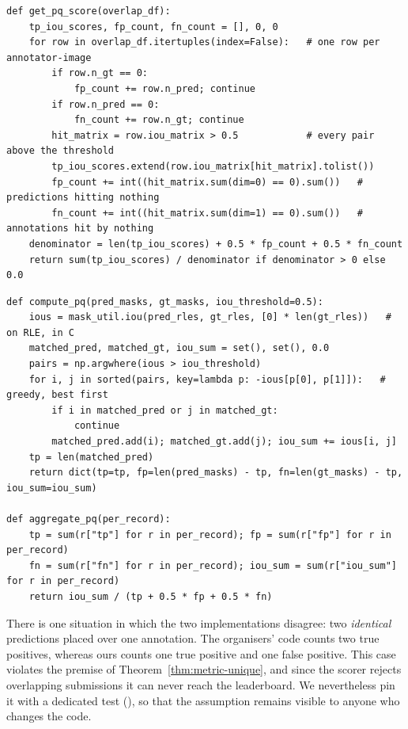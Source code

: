 \begin{lstlisting}[caption={The organisers' PQ, from their self-evaluation notebook (\file{experiments/exp\_145\_host\_evaluation/host/self\_evaluation\_notebook.ipynb}), lightly condensed.},label=lst:metric-host]
def get_pq_score(overlap_df):
    tp_iou_scores, fp_count, fn_count = [], 0, 0
    for row in overlap_df.itertuples(index=False):   # one row per annotator-image
        if row.n_gt == 0:
            fp_count += row.n_pred; continue
        if row.n_pred == 0:
            fn_count += row.n_gt; continue
        hit_matrix = row.iou_matrix > 0.5            # every pair above the threshold
        tp_iou_scores.extend(row.iou_matrix[hit_matrix].tolist())
        fp_count += int((hit_matrix.sum(dim=0) == 0).sum())   # predictions hitting nothing
        fn_count += int((hit_matrix.sum(dim=1) == 0).sum())   # annotations hit by nothing
    denominator = len(tp_iou_scores) + 0.5 * fp_count + 0.5 * fn_count
    return sum(tp_iou_scores) / denominator if denominator > 0 else 0.0
\end{lstlisting}

\begin{lstlisting}[caption={Our PQ for one record, and the pooling over records. Condensed from \file{shared/utils.py:compute\_pq} and \file{aggregate\_pq}.},label=lst:metric-ours]
def compute_pq(pred_masks, gt_masks, iou_threshold=0.5):
    ious = mask_util.iou(pred_rles, gt_rles, [0] * len(gt_rles))   # on RLE, in C
    matched_pred, matched_gt, iou_sum = set(), set(), 0.0
    pairs = np.argwhere(ious > iou_threshold)
    for i, j in sorted(pairs, key=lambda p: -ious[p[0], p[1]]):   # greedy, best first
        if i in matched_pred or j in matched_gt:
            continue
        matched_pred.add(i); matched_gt.add(j); iou_sum += ious[i, j]
    tp = len(matched_pred)
    return dict(tp=tp, fp=len(pred_masks) - tp, fn=len(gt_masks) - tp, iou_sum=iou_sum)

def aggregate_pq(per_record):
    tp = sum(r["tp"] for r in per_record); fp = sum(r["fp"] for r in per_record)
    fn = sum(r["fn"] for r in per_record); iou_sum = sum(r["iou_sum"] for r in per_record)
    return iou_sum / (tp + 0.5 * fp + 0.5 * fn)
\end{lstlisting}

There is one situation in which the two implementations disagree: two \emph{identical}
predictions placed over one annotation. The organisers' code counts two true positives, whereas ours
counts one true positive and one false positive. This case violates the premise of
Theorem~\ref{thm:metric-unique}, and since the scorer rejects overlapping submissions it can never
reach the leaderboard. We nevertheless pin it with a dedicated test
(), so that the assumption remains visible to anyone who
changes the code.

